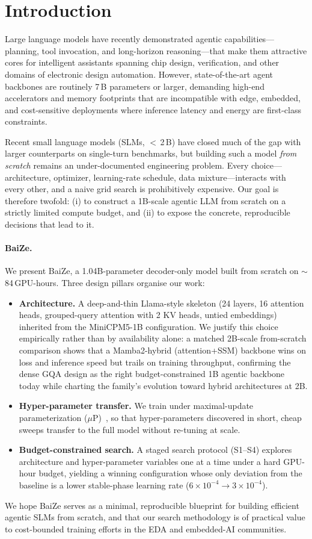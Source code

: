 \section{Introduction}

Large language models have recently demonstrated agentic capabilities---planning, tool invocation, and long-horizon reasoning---that make them attractive cores for intelligent assistants spanning chip design, verification, and other domains of electronic design automation.
However, state-of-the-art agent backbones are routinely 7\,B parameters or larger, demanding high-end accelerators and memory footprints that are incompatible with edge, embedded, and cost-sensitive deployments where inference latency and energy are first-class constraints.

Recent small language models (SLMs, $<\,$2\,B) have closed much of the gap with larger counterparts on single-turn benchmarks, but building such a model \emph{from scratch} remains an under-documented engineering problem.
Every choice---architecture, optimizer, learning-rate schedule, data mixture---interacts with every other, and a naive grid search is prohibitively expensive.
Our goal is therefore twofold: (i) to construct a 1B-scale agentic LLM from scratch on a strictly limited compute budget, and (ii) to expose the concrete, reproducible decisions that lead to it.

\paragraph{BaiZe.}
We present BaiZe, a 1.04B-parameter decoder-only model built from scratch on $\sim$84\,GPU-hours.
Three design pillars organise our work:

\begin{itemize}
\item \textbf{Architecture.} A deep-and-thin Llama-style skeleton (24 layers, 16 attention heads, grouped-query attention with 2 KV heads, untied embeddings) inherited from the MiniCPM5-1B configuration. We justify this choice empirically rather than by availability alone: a matched 2B-scale from-scratch comparison shows that a Mamba2-hybrid (attention+SSM) backbone wins on loss and inference speed but trails on training throughput, confirming the dense GQA design as the right budget-constrained 1B agentic backbone today while charting the family's evolution toward hybrid architectures at 2B.

\item \textbf{Hyper-parameter transfer.} We train under maximal-update parameterization ($\mu$P)~\cite{yang2022tensor}, so that hyper-parameters discovered in short, cheap sweeps transfer to the full model without re-tuning at scale.

\item \textbf{Budget-constrained search.} A staged search protocol (S1--S4) explores architecture and hyper-parameter variables one at a time under a hard GPU-hour budget, yielding a winning configuration whose only deviation from the baseline is a lower stable-phase learning rate ($6\times10^{-4}\rightarrow3\times10^{-4}$).
\end{itemize}

We hope BaiZe serves as a minimal, reproducible blueprint for building efficient agentic SLMs from scratch, and that our search methodology is of practical value to cost-bounded training efforts in the EDA and embedded-AI communities.